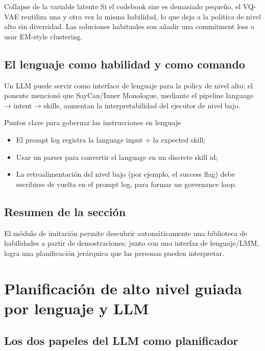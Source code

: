 \documentclass[a4paper]{article}
\begin{document}
\begin{warningbox}{Collapse de la variable latente}
Si el codebook size es demasiado pequeño, el VQ-VAE reutiliza una y otra vez la misma habilidad, lo que deja a la política de nivel alto sin diversidad. Las soluciones habituales son añadir una commitment loss o usar EM-style clustering.
\end{warningbox}

\subsection{El lenguaje como habilidad y como comando}

Un LLM puede servir como interface de lenguaje para la policy de nivel alto; el ponente mencionó que SayCan/Inner Monologue, mediante el pipeline language → intent → skills, aumentan la interpretabilidad del ejecutor de nivel bajo.

\begin{knowledgebox}{Puntos clave para gobernar las instrucciones en lenguaje}
\begin{itemize}
    \item El prompt log registra la language input + la expected skill;
    \item Usar un parser para convertir el language en un discrete skill id;
    \item La retroalimentación del nivel bajo (por ejemplo, el success flag) debe escribirse de vuelta en el prompt log, para formar un governance loop.
\end{itemize}
\end{knowledgebox}

\subsection{Resumen de la sección}

El módulo de imitación permite descubrir automáticamente una biblioteca de habilidades a partir de demostraciones; junto con una interfaz de lenguaje/LMM, logra una planificación jerárquica que las personas pueden interpretar.
\section{Planificación de alto nivel guiada por lenguaje y LLM}

\subsection{Los dos papeles del LLM como planificador}
\end{document}
